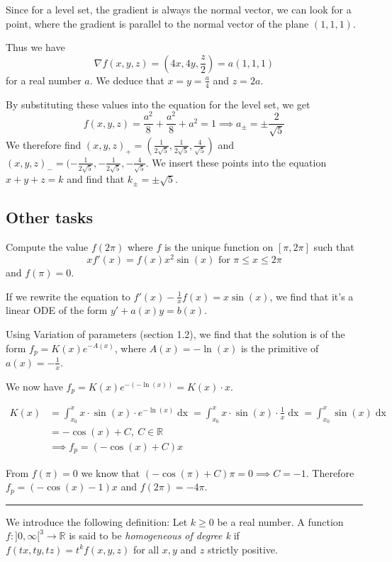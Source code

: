 \documentclass[a4paper,fontsize = 10pt]{article}
\def\R{\mathbb{R}}
\begin{document}
Since for a level set, the gradient is always the normal vector, we can look for a point, where the gradient is parallel to the normal vector of the plane $(1,1,1)$.

Thus we have 
\[\nabla f (x,y,z) = \left(4x,4y,\frac{z}{2}\right) = a (1,1,1)\]
for a real number $a$. We deduce that $x = y = \frac{a}{4}$ and $z = 2a$.

By substituting these values into the equation for the level set, we get 
\[f(x,y,z) = \frac{a^2}{8} + \frac{a^2}{8} + a^2 = 1 \implies a_{\pm} = \pm \frac{2}{\sqrt{5}}\]
We therefore find \((x,y,z)_+ = (\frac{1}{2\sqrt{5}}, \frac{1}{2\sqrt{5}}, \frac{4}{\sqrt{5}})\) and \((x,y,z)_- = (-\frac{1}{2\sqrt{5}}, -\frac{1}{2\sqrt{5}}, -\frac{4}{\sqrt{5}}\).
We insert these points into the equation $x + y + z = k$ and find that $k_\pm = \pm \sqrt{5}$.
\subsection{Other tasks}
Compute the value $f(2\pi)$ where $f$ is the unique function on $[\pi, 2\pi]$ such that 
\[xf'(x) = f(x) x^2\sin(x) \text{ for } \pi \leq x \leq 2\pi\]
and $f(\pi) = 0$.

\vspace{0.1cm}
If we rewrite the equation to \(f'(x) - \frac{1}{x}f(x) = x \sin(x)\), we find that it's a linear ODE of the form $y' + a(x)y = b(x)$.

Using Variation of parameters (section 1.2), we find that the solution is of the form \(f_p = K(x) e^{-A(x)}\), where $A(x) = -\ln(x)$ is the primitive of $a(x) = -\frac{1}{x}$.

We now have \(f_p = K(x) e^{-(-\ln(x))} = K(x) \cdot x\).

\begin{align*}
  K(x) &= \int_{x_0}^x x\cdot \sin(x) \cdot e^{-\ln(x)} \mathop{dx} = \int_{x_0}^x x\cdot \sin(x) \cdot \frac{1}{x} \mathop{dx} =  \int_{x_0}^x \sin(x) \mathop{dx}\\
  &= -\cos(x) + C, \ C \in \R\\
  &\implies f_p = (-\cos(x) + C)x
\end{align*}

From $f(\pi) = 0$ we know that $(-\cos(\pi) + C) \pi = 0 \implies C = -1$. Therefore $f_p = (-\cos(x) - 1)x$ and $f(2\pi) = -4 \pi$.

\vspace{0.1 cm}
\hrule
\vspace{0.2 cm}
We introduce the following definition: Let $k \geq 0$ be a real number. A function $f : ]0, \infty[^3 \to \R$ is said to be \textit{homogeneous of degree k} if $f (tx, ty, tz) =t^k f(x, y, z)$ for all $x, y$ and $z$ strictly positive. 
\end{document}
